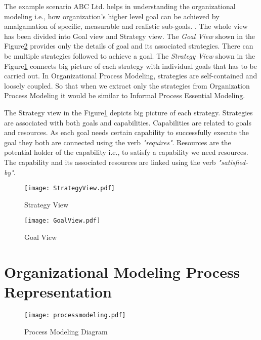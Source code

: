 \hspace{4ex} The example scenario ABC Ltd. helps in understanding the organizational modeling i.e., how organization's higher level goal can be achieved by amalgamation of specific, measurable and realistic sub-goals. . The whole view has been divided into Goal view and Strategy view. The \textit{Goal View} shown in the Figure\ref{fig:goalview} provides only the details of goal and its associated strategies. There can be multiple strategies followed to achieve a goal. The \textit{Strategy View} shown in the Figure\ref{fig:strategyview} connects big picture of each strategy with individual goals that has to be carried out. In Organizational Process Modeling, strategies are self-contained and loosely coupled. So that when we extract only the strategies from Organization Process Modeling it would be similar to Informal Process Essential Modeling. 

\hspace{4ex} The Strategy view  in the Figure\ref{fig:strategyview} depicts big picture of each strategy. Strategies are associated with both goals and capabilities. Capabilities are related to goals and resources. As each goal needs certain capability to successfully execute the goal they both are connected using the verb \textit{"requires"}. Resources are the potential holder of the capability i.e., to satisfy a capability we need resources. The capability and its associated resources are linked using the verb \textit{"satisfied-by"}. 


\begin{figure}
	\centering
	\texttt{[image: StrategyView.pdf]}
	\caption{Strategy View}
	\label{fig:strategyview}
\end{figure}

\begin{figure}
	\centering
	\texttt{[image: GoalView.pdf]}
	\caption{Goal View}
	\label{fig:goalview}
\end{figure}

\section{Organizational Modeling Process Representation}
\begin{figure}
	\centering
	\texttt{[image: processmodeling.pdf]}
	\caption{Process Modeling Diagram}
	\label{fig:processdiagram}
\end{figure}

